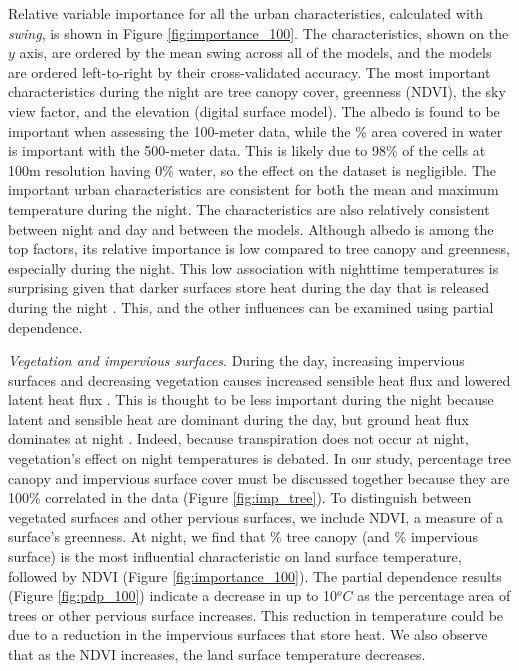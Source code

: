 \documentclass[review]{elsarticle}
\begin{document}
Relative variable importance for all the urban characteristics, calculated with \textit{swing}, is shown in Figure \ref{fig:importance_100}. 
The characteristics, shown on the $y$ axis, are ordered by the mean swing across all of the models, and the models are ordered left-to-right by their cross-validated accuracy.
The most important characteristics during the night are tree canopy cover, greenness (NDVI), the sky view factor, and the elevation (digital surface model).
The albedo is found to be important when assessing the 100-meter data, while the \% area covered in water is important with the 500-meter data.
This is likely due to 98\% of the cells at 100m resolution having 0\% water, so the effect on the dataset is negligible.
The important urban characteristics are consistent for both the mean and maximum temperature during the night.
The characteristics are also relatively consistent between night and day and between the models. 
Although albedo is among the top factors, its relative importance is low compared to tree canopy and greenness, especially during the night. 
This low association with nighttime temperatures is surprising given that darker surfaces store heat during the day that is released during the night \cite{Voogt2003-mm, Zhou2014-wc}.
This, and the other influences can be examined using partial dependence.

\textit{Vegetation and impervious surfaces}. 
During the day, increasing impervious surfaces and decreasing vegetation causes increased sensible heat flux and lowered latent heat flux \cite{Voogt2003-mm, Peng2012-iy, Zhou2014-wc}.
This is thought to be less important during the night because latent and sensible heat are dominant during the day, but ground heat flux dominates at night \cite{Zhou2014-wc, Voogt2003-mm}.
Indeed, because transpiration does not occur at night, vegetation's effect on night temperatures is debated. 
In our study, percentage tree canopy and impervious surface cover must be discussed together because they are 100\% correlated in the data (Figure \ref{fig:imp_tree}).
To distinguish between vegetated surfaces and other pervious surfaces, we include NDVI, a measure of a surface's greenness.
At night, we find that \% tree canopy (and \% impervious surface) is the most influential characteristic on land surface temperature, followed by NDVI (Figure \ref{fig:importance_100}).
The partial dependence results (Figure \ref{fig:pdp_100}) indicate a decrease in up to 10$^oC$ as the percentage area of trees or other pervious surface increases.
This reduction in temperature could be due to a reduction in the impervious surfaces that store heat.
We also observe that as the NDVI increases, the land surface temperature decreases.
\end{document}
